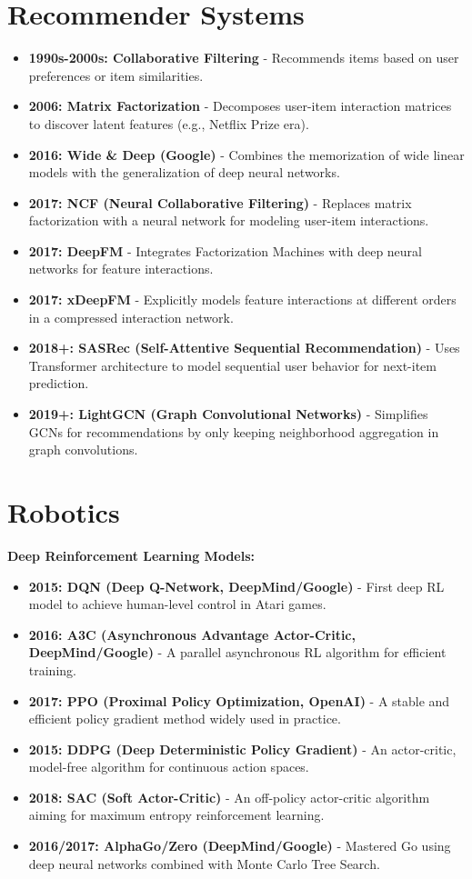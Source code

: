 \documentclass{article}
\begin{document}
\section{Recommender Systems}
\begin{itemize}[leftmargin=1.5em]
 \item \textbf{1990s-2000s: Collaborative Filtering} - Recommends items based on user preferences or item similarities.
 \item \textbf{2006: Matrix Factorization} - Decomposes user-item interaction matrices to discover latent features (e.g., Netflix Prize era).
 \item \textbf{2016: Wide \& Deep (Google)} - Combines the memorization of wide linear models with the generalization of deep neural networks.
 \item \textbf{2017: NCF (Neural Collaborative Filtering)} - Replaces matrix factorization with a neural network for modeling user-item interactions.
 \item \textbf{2017: DeepFM} - Integrates Factorization Machines with deep neural networks for feature interactions.
 \item \textbf{2017: xDeepFM} - Explicitly models feature interactions at different orders in a compressed interaction network.
 \item \textbf{2018+: SASRec (Self-Attentive Sequential Recommendation)} - Uses Transformer architecture to model sequential user behavior for next-item prediction.
 \item \textbf{2019+: LightGCN (Graph Convolutional Networks)} - Simplifies GCNs for recommendations by only keeping neighborhood aggregation in graph convolutions.
\end{itemize}

\section{Robotics}

\textbf{Deep Reinforcement Learning Models:}
\begin{itemize}[leftmargin=1.5em]
 \item \textbf{2015: DQN (Deep Q-Network, DeepMind/Google)} - First deep RL model to achieve human-level control in Atari games.
 \item \textbf{2016: A3C (Asynchronous Advantage Actor-Critic, DeepMind/Google)} - A parallel asynchronous RL algorithm for efficient training.
 \item \textbf{2017: PPO (Proximal Policy Optimization, OpenAI)} - A stable and efficient policy gradient method widely used in practice.
 \item \textbf{2015: DDPG (Deep Deterministic Policy Gradient)} - An actor-critic, model-free algorithm for continuous action spaces.
 \item \textbf{2018: SAC (Soft Actor-Critic)} - An off-policy actor-critic algorithm aiming for maximum entropy reinforcement learning.
 \item \textbf{2016/2017: AlphaGo/Zero (DeepMind/Google)} - Mastered Go using deep neural networks combined with Monte Carlo Tree Search.
\end{itemize}
\end{document}
